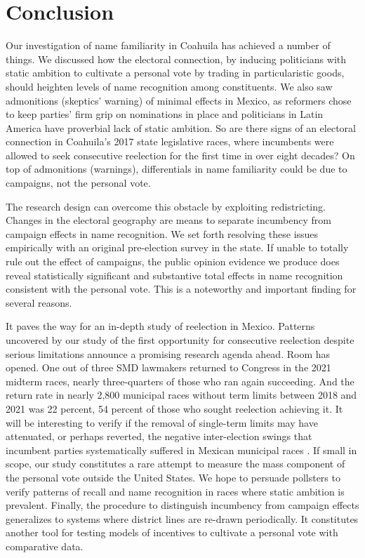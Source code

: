 \documentclass[letter,12pt]{article}
\begin{document}
\section{Conclusion}

Our investigation of name familiarity in Coahuila has achieved a number of things. We discussed how the electoral connection, by inducing politicians with static ambition to cultivate a personal vote by trading in particularistic goods, should heighten levels of name recognition among constituents. We also saw admonitions (skeptics' warning) of minimal effects in Mexico, as reformers chose to keep parties' firm grip on nominations in place and politicians in Latin America have proverbial lack of static ambition. So are there signs of an electoral connection in Coahuila's 2017 state legislative races, where incumbents were allowed to seek consecutive reelection for the first time in over eight decades? On top of admonitions (warnings), differentials in name familiarity could be due to campaigns, not the personal vote. 

The research design can overcome this obstacle by exploiting redistricting. Changes in the electoral geography are means to separate incumbency from campaign effects in name recognition. We set forth resolving these issues empirically with an original pre-election survey in the state. If unable to totally rule out the effect of campaigns, the public opinion evidence we produce does reveal statistically significant and substantive total effects in name recognition consistent with the personal vote. This is a noteworthy and important finding for several reasons. 

It paves the way for an in-depth study of reelection in Mexico. Patterns uncovered by our study of the first opportunity for consecutive reelection despite serious limitations announce a promising research agenda ahead. Room has opened. One out of three SMD lawmakers returned to Congress in the 2021 midterm races, nearly three-quarters of those who ran again succeeding. And the return rate in nearly 2,800 municipal races without term limits between 2018 and 2021 was 22 percent, 54 percent of those who sought reelection achieving it. It will be interesting to verify if the removal of single-term limits may have attenuated, or perhaps reverted, the negative inter-election swings that incumbent parties systematically suffered in Mexican municipal races \citep{lucardi.rosas.Incumbency.2016}. If small in scope, our study constitutes a rare attempt to measure the mass component of the personal vote outside the United States. We hope to persuade pollsters to verify patterns of recall and name recognition in races where static ambition is prevalent. Finally, the procedure to distinguish incumbency from campaign effects generalizes to systems where district lines are re-drawn periodically. It constitutes another tool for testing models of incentives to cultivate a personal vote with comparative data. 
\end{document}
